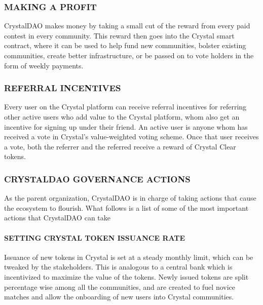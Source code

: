 \subsubsection{\texorpdfstring{\protect\hypertarget{_xf6xygxu22oo}{}{\protect\hypertarget{_Toc462050425}{}{}}MAKING
A PROFIT}{MAKING A PROFIT}}\label{making-a-profit}

CrystalDAO makes money by taking a small cut of the reward from every
paid contest in every community. This reward then goes into the Crystal
smart contract, where it can be used to help fund new communities,
bolster existing communities, create better infrastructure, or be passed
on to vote holders in the form of weekly payments.

\subsubsection{\texorpdfstring{\protect\hypertarget{_uux4chcwr06d}{}{\protect\hypertarget{_Toc462050426}{}{}}REFERRAL
INCENTIVES}{REFERRAL INCENTIVES}}\label{referral-incentives}

Every user on the Crystal platform can receive referral incentives for
referring other active users who add value to the Crystal platform, whom
also get an incentive for signing up under their friend. An active user
is anyone whom has received a vote in Crystal's value-weighted voting
scheme. Once that user receives a vote, both the referrer and the
referred receive a reward of Crystal Clear tokens.

\subsubsection{\texorpdfstring{\protect\hypertarget{_9g2kufwwnfdc}{}{\protect\hypertarget{_Toc462050427}{}{}}CRYSTALDAO
GOVERNANCE
ACTIONS}{CRYSTALDAO GOVERNANCE ACTIONS}}\label{crystaldao-governance-actions}

As the parent organization, CrystalDAO is in charge of taking actions
that cause the ecosystem to flourish. What follows is a list of some of
the most important actions that CrystalDAO can take

\paragraph{SETTING CRYSTAL TOKEN ISSUANCE
RATE}\label{setting-crystal-token-issuance-rate}

Issuance of new tokens in Crystal is set at a steady monthly limit,
which can be tweaked by the stakeholders. This is analogous to a central
bank which is incentivized to maximize the value of the tokens. Newly
issued tokens are split percentage wise among all the communities, and
are created to fuel novice matches and allow the onboarding of new users
into Crystal communities.

